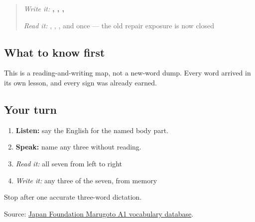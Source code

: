 \label{lesson:JA-C11-body-map}



\begin{quote}
\emph{Write it:} \textbf{, , , }

\emph{Read it:} \textbf{}, \textbf{}, \textbf{}, and \textbf{} once — the old repair exposure is now closed
\end{quote}

\subsection*{What to know first}
\begin{quote}
\textbf{            }
\end{quote}

This is a reading-and-writing map, not a new-word dump. Every word arrived in its own lesson, and every sign was already earned.

\subsection*{Your turn}
\begin{enumerate}
\raggedright
  \item \textbf{Listen:} say the English for the named body part.
  \item \textbf{Speak:} name any three without reading.
  \item \emph{Read it:} all seven from left to right
  \item \emph{Write it:} any three of the seven, from memory
\end{enumerate}

\begin{tcolorbox}[breakable,colback=teal!4,colframe=teal!35!black,title={Before you move on}]
Stop after one accurate three-word dictation.

Source: \href{https://words.marugotoweb.jp/}{Japan Foundation Marugoto A1 vocabulary database}.
\end{tcolorbox}
